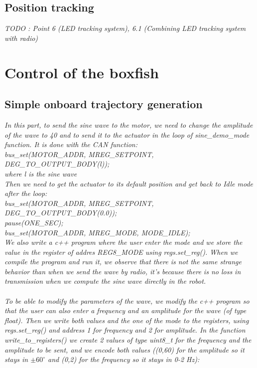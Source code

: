 \documentclass[11pt]{article}
\begin{document}
\subsection{Position tracking}

\textit{TODO : Point 6 (LED tracking system), 6.1 (Combining LED tracking system with radio)}

\section{Control of the boxfish}

\subsection{Simple onboard trajectory generation}

\textit{In this part, to send the sine wave to the motor, we need to change the amplitude of the wave to 40 and to send it to the actuator in the loop of sine\_demo\_mode function. It is done with the CAN function:
\\
bus\_set(MOTOR\_ADDR, MREG\_SETPOINT, DEG\_TO\_OUTPUT\_BODY(l));
\\
where l is the sine wave
\\
Then we need to get the actuator to its default position and get back to Idle mode after the loop:
\\
bus\_set(MOTOR\_ADDR, MREG\_SETPOINT, DEG\_TO\_OUTPUT\_BODY(0.0));
\\
pause(ONE\_SEC);
\\
bus\_set(MOTOR\_ADDR, MREG\_MODE, MODE\_IDLE);
\\
We also write a c++ program where the user enter the mode and we store the value in the register of addres REG8\_MODE using regs.set\_reg(). When we compile the program and run it, we observe that there is not the same strange behavior than when we send the wave by radio, it's because there is no loss in transmission when we compute the sine wave directly in the robot.
\\
\\
To be able to modify the parameters of the wave, we modify the c++ program so that the user can also enter a frequency and an amplitude for the wave (of type float). Then we write both values and the one of the mode to the registers, using regs.set\_reg() and address 1 for frequency and 2 for amplitude. In the function write\_to\_registers() we create 2 values of type uint8\_t for the frequency and the amplitude to be sent, and we encode both values ((0,60) for the amplitude so it stays in $\pm{60}^{\circ}$ and (0,2) for the frequency so it stays in 0-2 Hz):
}
\end{document}
